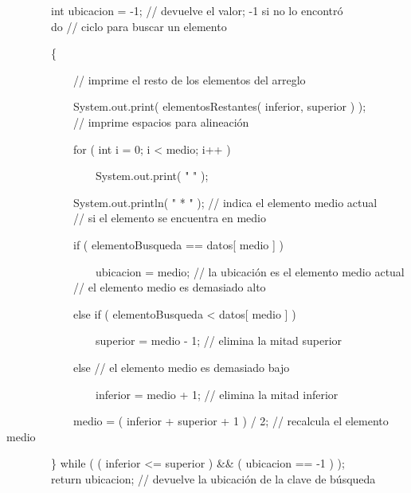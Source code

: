 {\noindent \ \ \ \ \ \ \ \ int ubicacion = -1; // devuelve el valor; -1 si no lo encontró\\

\noindent \ \ \ \ \ \ \ \ do // ciclo para buscar un elemento

\noindent \ \ \ \ \ \ \ \ \{

\noindent \ \ \ \ \ \ \ \ \ \ \ \ // imprime el resto de los elementos del arreglo

\noindent \ \ \ \ \ \ \ \ \ \ \ \ System.out.print( elementosRestantes( inferior, superior ) );\\

\noindent \ \ \ \ \ \ \ \ \ \ \ \ // imprime espacios para alineación

\noindent \ \ \ \ \ \ \ \ \ \ \ \ for ( int i = 0; i < medio; i++ )

\noindent \ \ \ \ \ \ \ \ \ \ \ \ \ \ \ \ System.out.print( "   " );

\noindent \ \ \ \ \ \ \ \ \ \ \ \ System.out.println( " * " ); // indica el elemento medio actual\\

\noindent \ \ \ \ \ \ \ \ \ \ \ \ // si el elemento se encuentra en medio

\noindent \ \ \ \ \ \ \ \ \ \ \ \ if ( elementoBusqueda == datos[ medio ] )

\noindent \ \ \ \ \ \ \ \ \ \ \ \ \ \ \ \ ubicacion = medio; // la ubicación es el elemento medio actual\\

\noindent \ \ \ \ \ \ \ \ \ \ \ \ // el elemento medio es demasiado alto

\noindent \ \ \ \ \ \ \ \ \ \ \ \ else if ( elementoBusqueda < datos[ medio ] )

\noindent \ \ \ \ \ \ \ \ \ \ \ \ \ \ \ \ superior = medio - 1; // elimina la mitad superior

\noindent \ \ \ \ \ \ \ \ \ \ \ \ else // el elemento medio es demasiado bajo

\noindent \ \ \ \ \ \ \ \ \ \ \ \ \ \ \ \ inferior = medio + 1; // elimina la mitad inferior

\noindent \ \ \ \ \ \ \ \ \ \ \ \ medio = ( inferior + superior + 1 ) / 2; // recalcula el elemento medio

\noindent \ \ \ \ \ \ \ \ \} while ( ( inferior <= superior ) \&\& ( ubicacion == -1 ) );\\

\noindent \ \ \ \ \ \ \ \ return ubicacion; // devuelve la ubicación de la clave de búsqueda

}
